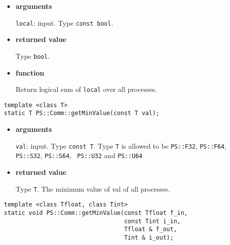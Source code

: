 \begin{itemize}

\item{\bf arguments}

{\tt local}: input. Type {\tt const bool}.

\item{\bf returned value}

Type {\tt bool}.

\item{\bf function}

Return logical sum of {\tt local} over all processes.

\end{itemize}


\begin{screen}
\begin{verbatim}
template <class T>
static T PS::Comm::getMinValue(const T val);
\end{verbatim}
\end{screen}

\begin{itemize}

\item{\bf arguments}

{\tt val}: input. Type {\tt const T}. Type {\tt T} is allowed to be
{\tt PS::F32}, {\tt PS::F64}, {\tt PS::S32}, {\tt PS::S64}, {\tt
PS::U32} and {\tt PS::U64}


\item{\bf returned value}

Type {\tt T}. The minimum value of val of all processes.


\end{itemize}

\begin{screen}
\begin{verbatim}
template <class Tfloat, class Tint>
static void PS::Comm::getMinValue(const Tfloat f_in,
                                  const Tint i_in,
                                  Tfloat & f_out,
                                  Tint & i_out);
\end{verbatim}
\end{screen}

